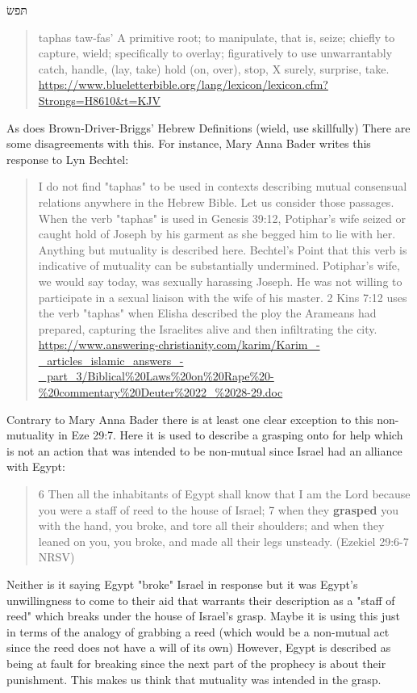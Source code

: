 \documentclass[11pt]{article}
\begin{document}
 \begin{hebrew} תּפשׂ  \end{hebrew}
\begin{quote}
taphas \newline
taw-fas' \newline
A primitive root; to manipulate, that is, seize; chiefly to capture, wield; specifically to overlay; figuratively to use unwarrantably
 catch, handle, (lay, take) hold (on, over), stop, X surely, surprise, take. \newline
\url{https://www.blueletterbible.org/lang/lexicon/lexicon.cfm?Strongs=H8610&t=KJV}
\end{quote}

As does Brown-Driver-Briggs' Hebrew Definitions (wield, use skillfully) There are some disagreements with this. For instance, Mary Anna Bader writes this response to Lyn Bechtel:

\begin{quote}
I do not find "taphas" to be used in contexts describing mutual consensual relations anywhere in the Hebrew Bible. Let us consider those passages. When the verb "taphas" is used in Genesis 39:12, Potiphar's wife seized or caught hold of Joseph by his garment as she begged him to lie with her. Anything but mutuality is described here. Bechtel's Point that this verb is indicative of mutuality can be substantially undermined. Potiphar's wife, we would say today, was sexually harassing Joseph. He was not willing to participate in a sexual liaison with the wife of his master. 2 Kins 7:12 uses the verb "taphas" when Elisha described the ploy the Arameans had prepared, capturing the Israelites alive and then infiltrating the city. 
\url{https://www.answering-christianity.com/karim/Karim_-_articles_islamic_answers_-_part_3/Biblical\%20Laws\%20on\%20Rape\%20-\%20commentary\%20Deuter\%2022_\%2028-29.doc}
\end{quote}

Contrary to Mary Anna Bader there is at least one clear exception to this non-mutuality in Eze 29:7. Here it is used to describe a grasping onto for help which is not an action that was intended to be non-mutual since Israel had an alliance with Egypt:
\begin{quote}
6 Then all the inhabitants of Egypt shall know
    that I am the Lord
because you were a staff of reed
    to the house of Israel;
7 when they \textbf{grasped} you with the hand, you broke,
    and tore all their shoulders;
and when they leaned on you, you broke,
    and made all their legs unsteady.
    (Ezekiel 29:6-7 NRSV)
\end{quote}
Neither is it saying Egypt "broke" Israel in response but it was Egypt's unwillingness to come to their aid that warrants their description as a "staff of reed" which breaks under the house of Israel's grasp. Maybe it is using this just in terms of the analogy of grabbing a reed (which would be a non-mutual act since the reed does not have a will of its own) However, Egypt is described as being at fault for breaking since the next part of the prophecy is about their punishment. This makes us think that mutuality was intended in the grasp.
\end{document}
